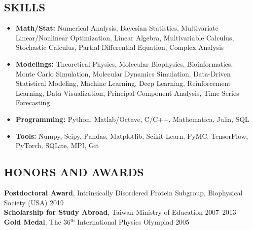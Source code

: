 \documentclass[11pt,letterpaper, sans]{article}
\newcommand{\newsec}[1]{\subsection*{\hspace{-1.5pt}\uppercase{#1}}}
\begin{document}
\begin{flushleft}
\newsec{Skills}
\begin{itemize}[leftmargin=*]\itemsep-0.1em
%
\item {\bf Math/Stat:}
Numerical Analysis, 
Bayesian Statistics, 
Multivariate Linear/Nonlinear Optimization, 
Linear Algebra, 
Multivariable Calculus,
Stochastic Calculus,
Partial Differential Equation, 
Complex Analysis %
\item{\bf Modelings:}
Theoretical Physics, Molecular Biophysics, Bioinformatics,
Monte Carlo Simulation, Molecular Dynamics Simulation, %
Data-Driven Statistical Modeling,
Machine Learning,
Deep Learning, Reinforcement Learning, %
Data Visualization, 
Principal Component Analysis, 
Time Series Forecasting
%
\item{\bf Programming:} 
Python, Matlab/Octave, C/C++, Mathematica, Julia, SQL
%
\item{\bf Tools:}
Numpy, Scipy, Pandas, Matplotlib, Scikit-Learn, PyMC, TensorFlow, PyTorch, SQLite, MPI, Git
%


\end{itemize}


\newsec{Honors and Awards}

\noindent
{\bf Postdoctoral Award}, Intrinsically Disordered Protein Subgroup, Biophysical Society (USA) \hfill 2019 \\
{\bf Scholarship for Study Abroad}, Taiwan Ministry of Education  \hfill 2007--2013 \\
{\bf Gold Medal}, The 36$^{ \mathsf{th}}$ International Physics Olympiad \hfill 2005


\end{flushleft}
\end{document}
